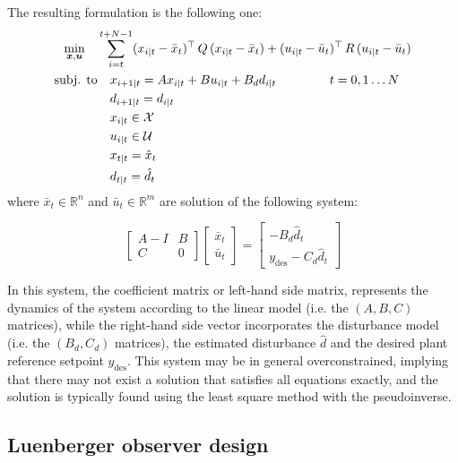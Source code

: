 \documentclass[a4paper,12pt,oneside]{book}
\begin{document}
The resulting formulation is the following one:
\begin{equation}
\begin{alignedat}{2}
	\min_{\substack{\boldsymbol{x}, \boldsymbol{u}}}\quad & \sum_{i=t}^{t+N-1} (x_{i|t} - \bar{x}_t) ^\top \, Q \, (x_{i|t} -  \bar{x}_t) +  (u_{i|t} - \bar{u}_t)^\top \, R \, (u_{i|t} - \bar{u}_t) &&  \\
	\text{subj. to} & \quad x_{i+1|t}  = A x_{i|t} + B u_{i|t} + B_d d_{i|t} \hspace{1.5cm} t = 0, 1 \ldots N &&  \\
    & \quad d_{i+1|t}  = d_{i|t} && \\
    &\quad x_{i|t} \in \mathcal{X} &&  \\
    &\quad u_{i|t} \in \mathcal{U} && \\
    &\quad x_{t|t} = \hat{x}_t && \\
    &\quad d_{t|t} = \hat{d}_t && 
\end{alignedat}
\label{MPC:offset-free}
\end{equation}
where $\bar{x}_t \in \mathbb{R}^n$ and $\bar{u}_t \in \mathbb{R}^m$ are solution of the following system:

\begin{equation}
    \begin{bmatrix}
    A-I & B \\
    C & 0
	\end{bmatrix}
 	\begin{bmatrix}
		\bar{x}_t \\
		\bar{u}_t
	\end{bmatrix}
    =
    \begin{bmatrix}
    -B_d \hat{d}_t\\
    y_{\text{des}} - C_d \hat{d}_t
	\end{bmatrix}
\end{equation}

In this system, the coefficient matrix or left-hand side matrix, represents the dynamics of the system according to the linear model (i.e. the $(A, B, C)$ matrices), while the right-hand side vector incorporates the disturbance model (i.e. the $(B_d, C_d)$ matrices), the estimated disturbance $\hat{d}$ and the desired plant reference setpoint $y_{\text{des}}$.
This system may be in general overconstrained, implying that there may not exist a solution that satisfies all equations exactly, and the solution is typically found using the least square method with the pseudoinverse.

\subsection*{Luenberger observer design}
\end{document}
